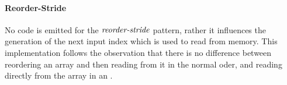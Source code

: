 %

\paragraph{Reorder-Stride}
No code is emitted for the $\text{\textit{reorder-stride}}$ pattern, rather it influences the generation of the next input index which is used to read from memory.
This implementation follows the observation that there is no difference between reordering an array and then reading from it in the normal oder, and reading directly from the array in an .

